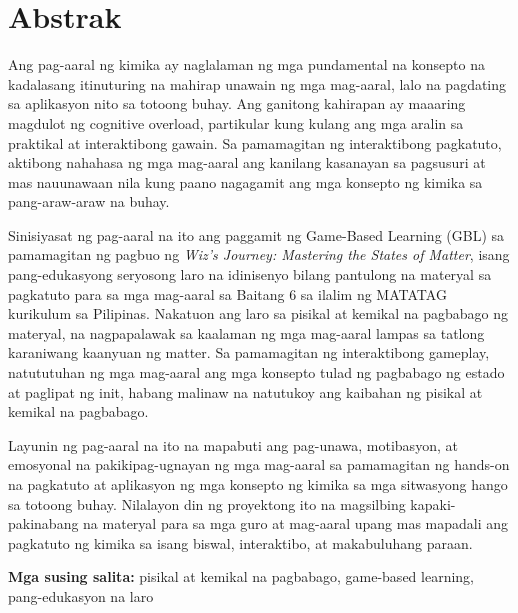 \chapter*{Abstrak}

Ang pag-aaral ng kimika ay naglalaman ng mga pundamental na konsepto na kadalasang itinuturing na mahirap unawain ng mga mag-aaral, lalo na pagdating sa aplikasyon nito sa totoong buhay. Ang ganitong kahirapan ay maaaring magdulot ng cognitive overload, partikular kung kulang ang mga aralin sa praktikal at interaktibong gawain. Sa pamamagitan ng interaktibong pagkatuto, aktibong nahahasa ng mga mag-aaral ang kanilang kasanayan sa pagsusuri at mas nauunawaan nila kung paano nagagamit ang mga konsepto ng kimika sa pang-araw-araw na buhay.

Sinisiyasat ng pag-aaral na ito ang paggamit ng Game-Based Learning (GBL) sa pamamagitan ng pagbuo ng \textit{Wiz's Journey: Mastering the States of Matter}, isang pang-edukasyong seryosong laro na idinisenyo bilang pantulong na materyal sa pagkatuto para sa mga mag-aaral sa Baitang 6 sa ilalim ng MATATAG kurikulum sa Pilipinas. Nakatuon ang laro sa pisikal at kemikal na pagbabago ng materyal, na nagpapalawak sa kaalaman ng mga mag-aaral lampas sa tatlong karaniwang kaanyuan ng matter. Sa pamamagitan ng interaktibong gameplay, natututuhan ng mga mag-aaral ang mga konsepto tulad ng pagbabago ng estado at paglipat ng init, habang malinaw na natutukoy ang kaibahan ng pisikal at kemikal na pagbabago.

Layunin ng pag-aaral na ito na mapabuti ang pag-unawa, motibasyon, at emosyonal na pakikipag-ugnayan ng mga mag-aaral sa pamamagitan ng hands-on na pagkatuto at aplikasyon ng mga konsepto ng kimika sa mga sitwasyong hango sa totoong buhay. Nilalayon din ng proyektong ito na magsilbing kapaki-pakinabang na materyal para sa mga guro at mag-aaral upang mas mapadali ang pagkatuto ng kimika sa isang biswal, interaktibo, at makabuluhang paraan.

\vspace{1cm}

\noindent\textbf{Mga susing salita:} pisikal at kemikal na pagbabago, game-based learning, pang-edukasyon na laro
